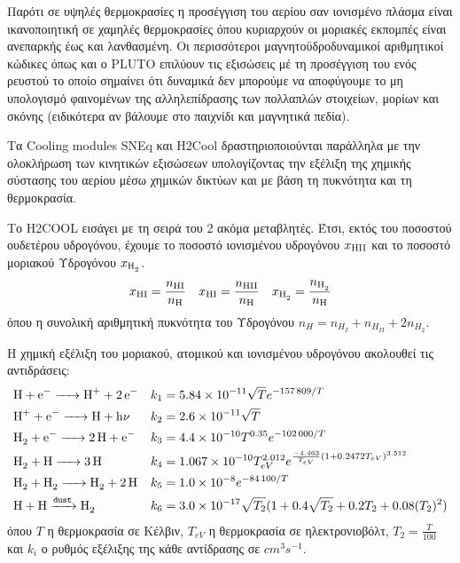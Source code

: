 	Παρότι σε υψηλές θερμοκρασίες η προσέγγιση του αερίου σαν ιονισμένο πλάσμα είναι ικανοποιητική
	σε χαμηλές θερμοκρασίες όπου κυριαρχούν οι μοριακές εκπομπές είναι ανεπαρκής έως και λανθασμένη. Οι περισσότεροι μαγνητοϋδροδυναμικοί αριθμητικοί κώδικες όπως και ο PLUTO επιλύουν τις εξισώσεις μέ τη προσέγγιση του ενός ρευστού το οποίο σημαίνει ότι δυναμικά δεν μπορούμε να αποφύγουμε το μη υπολογισμό φαινομένων της αλληλεπίδρασης των πολλαπλών στοιχείων, μορίων και σκόνης (ειδικότερα αν βάλουμε στο παιχνίδι και μαγνητικά πεδία). 
	
	Tα Cooling modules SNEq και H2Cool δραστηριοποιούνται παράλληλα με την ολοκλήρωση των κινητικών εξισώσεων υπολογίζοντας την εξέλιξη της χημικής σύστασης του αερίου μέσω χημικών δικτύων και με βάση τη πυκνότητα και τη θερμοκρασία.  
	
%	
	
	Το H2COOL εισάγει με τη σειρά του 2 ακόμα μεταβλητές. Έτσι, εκτός του ποσοστού ουδετέρου υδρογόνου, έχουμε το ποσοστό ιονισμένου υδρογόνου $x_{\ce{HII}}$ και το ποσοστό μοριακού Υδρογόνου $x_{\ce{H2}}$.
	\begin{align}
	x_{\ce{HI}} =\frac{n_{\ce{HI}}}{n_{\ce{H}}} && x_{\ce{HI}} =\frac{n_{\ce{HII}}}{n_{\ce{H}}} && x_{\ce{H2}} =\frac{n_{\ce{H2}}}{n_{\ce{H}}} 
	\end{align}
	όπου η συνολική αριθμητική πυκνότητα του Υδρογόνου $n_H=n_{H_I}+n_{H_{II}}+2n_{H_2}$.
	
	Η χημική εξέλιξη του μοριακού, ατομικού και ιονισμένου υδρογόνου ακολουθεί τις αντιδράσεις:
	\begin{align}
	&\ce{H + e^- -> H^+ + 2e^-} && k_1 = \num{5.84e-11} \sqrt{T} e^{\num{-157809}/T} \\
	&\ce{H^+ + e^- -> H + h\nu} && k_2 = \num{2.6e-11} \sqrt{T}\\
	&\ce{H_2 + e^- -> 2H + e^-} && k_3 = \num{4.4e-10}T^{0.35} e^{\num{-102000}/T}\\
	&\ce{H_2 + H -> 3H} && k_4=\num{1.067e-10}T_{eV}^{2.012} e^{\frac{\num{-4.463}}{T_{eV}}(1+\num{0.2472}T_{eV})^{3.512}}\\
	&\ce{H_2 + H_2 -> H_2 + 2H} && k_5=\num{1.0e-8}e^{-\num{84100}/T} \\
	&\ce{H + H ->[\mathtt{dust}] H_2} && k_6=\num{3.0e-17}\sqrt{T_2} (1+0.4\sqrt{T_2}+0.2 T_2 +0.08 (T_2)^2)
	\end{align}
	όπου $T$ η θερμοκρασία σε Κέλβιν, $T_{eV}$ η θερμοκρασία σε ηλεκτρονιοβόλτ, $T_2=\frac{T}{100}$ και $k_i$ ο ρυθμός εξέλιξης της κάθε αντίδρασης σε $\si{cm^3 s^{-1}}$.
	
